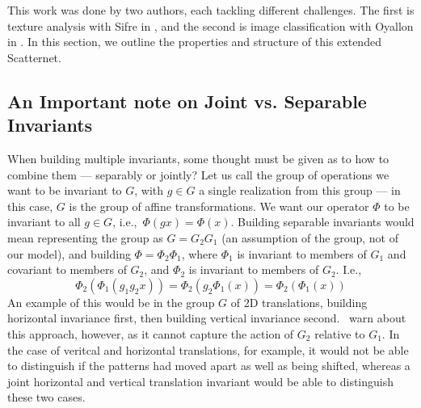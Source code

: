   This work was done by two authors, each tackling different
  challenges. The first is texture analysis with Sifre in
  \citep{sifre_combined_2012, sifre_rotation_2013, sifre_rigid-motion_2014,
  sifre_rigid-motion_2014-1}, and the second is image classification with
  Oyallon in \citep{oyallon_generic_2013, oyallon_deep_2015}. In this section,
  we outline the properties and structure of this extended Scatternet.

\subsection{An Important note on Joint vs. Separable Invariants}
  When building multiple invariants, some thought must be given as to how to
  combine them --- separably or jointly? Let us call the group of operations we
  want to be invariant to $G$, with $g \in G$ a single realization from this
  group --- in this case, $G$ is the group of affine transformations. We want
  our operator $\Phi$ to be invariant to all  $g \in G$, i.e.,\ $\Phi(gx)
  = \Phi(x)$. Building separable invariants would mean representing the group
  as $G=G_2G_1$ (an assumption of the group, not of our model), and building
  $\Phi = \Phi_2 \Phi_1$, where $\Phi_1$ is invariant to members of $G_1$ and
  covariant to members of $G_2$, and $\Phi_2$ is invariant to members of $G_2$.
  I.e.,\
  \begin{equation}
    \Phi_2(\Phi_1(g_1g_2x)) = \Phi_2(g_2\Phi_1(x)) = \Phi_2(\Phi_1(x))
  \end{equation}
  An example of this would be in the group $G$ of 2D translations, building
  horizontal invariance first, then building vertical invariance second.
  \Bruna\ warn about this approach, however, as it cannot capture the action
  of $G_2$ relative to $G_1$. In the case of veritcal and horizontal
  translations, for example, it would not be able to distinguish if the
  patterns had moved apart as well as being shifted, whereas a joint
  horizontal and vertical translation invariant would be able to distinguish
  these two cases.

